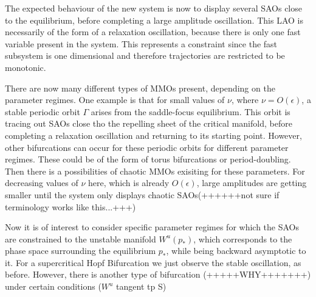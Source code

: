 The expected behaviour of the new system is now to display several SAOs close to the equilibrium, before completing a large amplitude oscillation. This LAO is necessarily of the form of a relaxation oscillation, because there is only one fast variable present in the system. This represents a constraint since the fast subsystem is one dimensional and therefore trajectories are restricted to be monotonic.

There are now many different types of MMOs present, depending on the parameter regimes.
One example is that for small values of $\nu$, where $\nu=O(\epsilon)$, a stable periodic orbit $\Gamma$ arises from the saddle-focus equilibrium. This orbit is tracing out SAOs close tho the repelling sheet of the critical manifold, before completing a relaxation oscillation and returning to its starting point.
However, other bifurcations can occur for these periodic orbits for different parameter regimes. These could be of the form of torus bifurcations or period-doubling. Then there is a possibilities of chaotic MMOs exisiting for these parameters. For decreasing values of $\nu$ here, which is already $O(\epsilon)$, large amplitudes are getting smaller until the system only displays chaotic SAOs(++++++not sure if terminology works like this...+++)

Now it is of interest to consider specific parameter regimes for which the SAOs are constrained to the unstable manifold $W^u(p_*)$, which corresponds to the phase space surrounding the equilibrium $p_*$, while being backward asymptotic to it.
For a supercritical Hopf Bifurcation we just observe the stable oscillation, as before. However, there is another type of bifurcation (+++++WHY+++++++) under certain conditions ($W^u$ tangent tp S)
